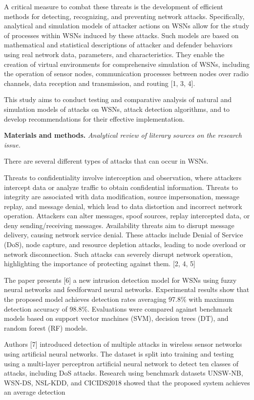 A critical measure to combat these threats is the development of
efficient methods for detecting, recognizing, and preventing network
attacks. Specifically, analytical and simulation models of attacker
actions on WSNs allow for the study of processes within WSNs induced by
these attacks. Such models are based on mathematical and statistical
descriptions of attacker and defender behaviors using real network data,
parameters, and characteristics. They enable the creation of virtual
environments for comprehensive simulation of WSNs, including the
operation of sensor nodes, communication processes between nodes over
radio channels, data reception and transmission, and routing {[}1, 3,
4{]}.

This study aims to conduct testing and comparative analysis of natural
and simulation models of attacks on WSNs, attack detection algorithms,
and to develop recommendations for their effective implementation.

{\bfseries Materials and methods.} \emph{Analytical review of literary
sources on the research issue.}

There are several different types of attacks that can occur in WSNs.

Threats to confidentiality involve interception and observation, where
attackers intercept data or analyze traffic to obtain confidential
information. Threats to integrity are associated with data modification,
source impersonation, message replay, and message denial, which lead to
data distortion and incorrect network operation. Attackers can alter
messages, spoof sources, replay intercepted data, or deny
sending/receiving messages. Availability threats aim to disrupt message
delivery, causing network service denial. These attacks include Denial
of Service (DoS), node capture, and resource depletion attacks, leading
to node overload or network disconnection. Such attacks can severely
disrupt network operation, highlighting the importance of protecting
against them. {[}2, 4, 5{]}

The paper presents {[}6{]} a new intrusion detection model for WSNs
using fuzzy neural networks and feedforward neural networks.
Experimental results show that the proposed model achieves detection
rates averaging 97.8\% with maximum detection accuracy of 98.8\%.
Evaluations were compared against benchmark models based on support
vector machines (SVM), decision trees (DT), and random forest (RF)
models.

Authors {[}7{]} introduced detection of multiple attacks in wireless
sensor networks using artificial neural networks. The dataset is split
into training and testing using a multi-layer perceptron artificial
neural network to detect ten classes of attacks, including DoS attacks.
Research using benchmark datasets UNSW-NB, WSN-DS, NSL-KDD, and
CICIDS2018 showed that the proposed system achieves an average detection

